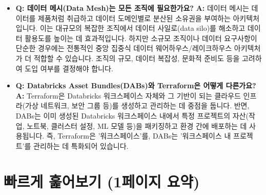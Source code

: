 \documentclass[11pt,a4paper]{article}
\begin{document}
\begin{itemize}
    \item \textbf{Q: 데이터 메시(Data Mesh)는 모든 조직에 필요한가요?}
    \textbf{A:} 데이터 메시는 데이터를 제품처럼 취급하고 데이터 도메인별로 분산된 소유권을 부여하는 아키텍처입니다. 이는 대규모의 복잡한 조직에서 데이터 사일로(data silo)를 해소하고 데이터 활용도를 높이는 데 효과적입니다. 하지만 소규모 조직이나 데이터 요구사항이 단순한 경우에는 전통적인 중앙 집중식 데이터 웨어하우스/레이크하우스 아키텍처가 더 적합할 수 있습니다. 조직의 규모, 데이터 복잡성, 문화적 준비도 등을 고려하여 도입 여부를 결정해야 합니다.

    \item \textbf{Q: Databricks Asset Bundles(DABs)와 Terraform은 어떻게 다른가요?}
    \textbf{A:} Terraform은 Databricks 워크스페이스 자체와 그 기반이 되는 클라우드 인프라(가상 네트워크, 보안 그룹 등)를 생성하고 관리하는 데 중점을 둡니다. 반면, DABs는 이미 생성된 Databricks 워크스페이스 내에서 특정 프로젝트의 자산(작업, 노트북, 클러스터 설정, ML 모델 등)을 패키징하고 환경 간에 배포하는 데 사용됩니다. 즉, Terraform은 '워크스페이스'를, DABs는 '워크스페이스 내 프로젝트'를 관리하는 데 특화되어 있습니다.
\end{itemize}

\newpage
\section{빠르게 훑어보기 (1페이지 요약)}
\end{document}
